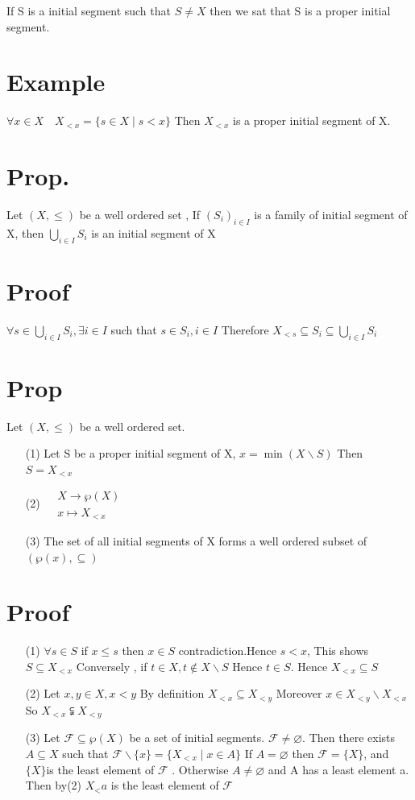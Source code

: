 \documentclass{book}
\begin{document}
If S is a initial segment such that $S\neq X$ then we sat that S is a proper initial segment.
\section{Example}$\forall x\in X\quad X_{<x}=\{s\in X\mid s<x\}$ Then $X_{<x}$ is a proper initial segment of X.
\section{Prop.}Let $(X,\leq)$ be a well ordered set , If $(S_i)_{i\in I}$ is a family of initial segment of X, then $\bigcup\limits_{i\in I}S_i$ is an initial segment of X
\section{Proof}
$\forall s\in \bigcup\limits_{i\in I}S_i,\exists i\in I$ such that $s\in S_i,i\in I$ Therefore $X_{<s}\subseteq S_i\subseteq\bigcup\limits_{i\in I}S_i$
\section{Prop}
Let $(X,\leq)$ be a well ordered set.
\begin{itemize}
    \item[(1)] Let S be a proper initial segment of X, $x= \min(X\backslash S)$ Then $S=X_{<x}$
    \item[(2)] $\begin{aligned}
        &X\rightarrow\wp(X)\\ &x\mapsto X_{<x}
    \end{aligned}$
    \item[(3)] The set of all initial segments of X forms a well ordered subset of $(\wp(x),\subseteq)$
\end{itemize}
\section{Proof}
\begin{itemize}
    \item [(1)] $\forall s\in S$ if $x\leq s$ then $x\in S$ contradiction.Hence $s<x$, This shows $S\subseteq X_{<x}$ Conversely , if $t\in X, t\not\in X\backslash S$ Hence $t\in S.$ Hence $X_{<x}\subseteq S$
    \item [(2)]Let $x,y\in X,x<y$ By definition $X_{<x}\subseteq X_{<y}$ Moreover $x\in X_{<y}\backslash X_{<x}$ So $X_{<x}\subsetneqq X_{<y}$
    \item [(3)]Let $\mathcal{F}\subseteq\wp(X)$ be a set of initial segments. $\mathcal{F}\not=\varnothing$. Then there exists $A\subseteq X$ such that $\mathcal{F}\backslash \{x\}=\{X_{<x}\mid x\in A\}$ If $A=\varnothing$ then $\mathcal{F}=\{X\}$, and $\{X\}$is the least element of $\mathcal{F}$ . Otherwise $A\not=\varnothing$ and A has a least element a. Then by(2) $X_<a$ is the least element of $\mathcal{F}$
\end{itemize} 
\end{document}
